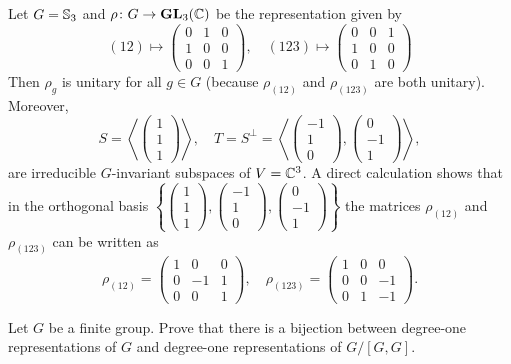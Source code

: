 \begin{example}
    Let $G=\mathbb{S}_3$ and $\rho\colon G\to\mathbf{GL}_3(\mathbb{C})$ be the representation given by
    \[
    (12)\mapsto\begin{pmatrix}
    0&1&0\\
    1&0&0\\
    0&0&1
    \end{pmatrix},\quad
    (123)\mapsto\begin{pmatrix}
    0&0&1\\
    1&0&0\\
    0&1&0
    \end{pmatrix}
    \]
    Then $\rho_g$ is unitary for all $g\in G$ (because $\rho_{(12)}$ and $\rho_{(123)}$ are both
    unitary). Moreover, 
    \[
    S=\left\langle \begin{pmatrix}
    1\\1\\1
    \end{pmatrix}
    \right\rangle,
    \quad
    T=S^{\perp}=\left\langle
    \begin{pmatrix}
    -1\\1\\0
    \end{pmatrix},
    \begin{pmatrix}
    0\\-1\\1
    \end{pmatrix}
    \right\rangle,
    \]
    are irreducible $G$-invariant subspaces of $V=\mathbb{C}^3$. A direct calculation shows that 
    in the orthogonal basis $\left\{\begin{pmatrix}
    1\\1\\1
    \end{pmatrix},
    \begin{pmatrix}
    -1\\1\\0
    \end{pmatrix},
    \begin{pmatrix}
    0\\-1\\1
    \end{pmatrix}
    \right\}$ 
    the matrices $\rho_{(12)}$ and $\rho_{(123)}$ can be written as 
    \[
    \rho_{(12)}=\begin{pmatrix}
        1&0&0\\
        0&-1&1\\
        0&0&1
    \end{pmatrix},
    \quad
    \rho_{(123)}=
    \begin{pmatrix}
        1&0&0\\
        0&0&-1\\
        0&1&-1
    \end{pmatrix}.
    \]
\end{example}

\begin{exercise}
Let $G$ be a finite group. 
Prove that there is a bijection between degree-one representations of $G$ and
degree-one representations of $G/[G,G]$.
\end{exercise}
